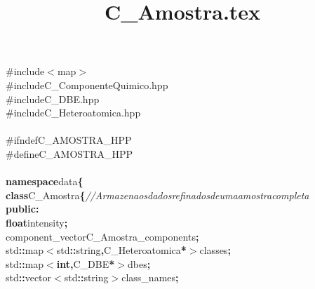 \documentclass[a4paper, 11pt]{article}
\title{C_Amostra.tex}
\newcommand\SPC{\hspace*{0.6em}}
\newcommand\QOT{\mbox{\char 34}}
\newcommand{\CppAComment}[1]{\textit{\textcolor[rgb]{0.2,0.6,1}{#1}}}
\newcommand{\CppAIdentifier}[1]{#1}
\newcommand{\CppAPreprocessor}[1]{\textcolor[rgb]{0,0.5,0}{#1}}
\newcommand{\CppAReservedWord}[1]{\textbf{#1}}
\newcommand{\CppASpace}[1]{\colorbox[rgb]{1,1,1}{#1}}
\newcommand{\CppASymbol}[1]{\textbf{\textcolor[rgb]{1,0,0}{#1}}}
\begin{document}
\begin{ttfamily}
\noindent
\CppAPreprocessor{\#include\SPC $<$map$>$}\\
\CppAPreprocessor{\#include\SPC \QOT C\_ComponenteQuimico.hpp\QOT }\\
\CppAPreprocessor{\#include\SPC \QOT C\_DBE.hpp\QOT }\\
\CppAPreprocessor{\#include\SPC \QOT C\_Heteroatomica.hpp\QOT }\\
\\
\CppAPreprocessor{\#ifndef\SPC C\_AMOSTRA\_HPP}\\
\CppAPreprocessor{\#define\SPC C\_AMOSTRA\_HPP}\\
\\
\CppAReservedWord{namespace}\CppASpace{\SPC }\CppAIdentifier{data}\CppASymbol{\{}\\
\CppASpace{\SPC \SPC \SPC \SPC \SPC \SPC \SPC \SPC }\CppAReservedWord{class}\CppASpace{\SPC }\CppAIdentifier{C\_Amostra}\CppASymbol{\{}\CppASpace{\SPC }\CppAComment{//\SPC Armazena\SPC os\SPC dados\SPC refinados\SPC de\SPC uma\SPC amostra\SPC completa}\\
\CppASpace{\SPC \SPC \SPC \SPC \SPC \SPC \SPC \SPC }\CppAReservedWord{public}\CppASymbol{:}\\
\CppASpace{\SPC \SPC \SPC \SPC \SPC \SPC \SPC \SPC \SPC \SPC \SPC \SPC }\CppAReservedWord{float}\CppASpace{\SPC }\CppAIdentifier{intensity}\CppASymbol{;}\\
\CppASpace{\SPC \SPC \SPC \SPC \SPC \SPC \SPC \SPC \SPC \SPC \SPC \SPC }\CppAIdentifier{component\_vector}\CppASpace{\SPC }\CppAIdentifier{C\_Amostra\_components}\CppASymbol{;}\\
\CppASpace{\SPC \SPC \SPC \SPC \SPC \SPC \SPC \SPC \SPC \SPC \SPC \SPC }\CppAIdentifier{std}\CppASymbol{::}\CppAIdentifier{map}\CppASymbol{$<$}\CppAIdentifier{std}\CppASymbol{::}\CppAIdentifier{string}\CppASymbol{,}\CppASpace{\SPC }\CppAIdentifier{C\_Heteroatomica}\CppASymbol{*}\CppASymbol{$>$}\CppASpace{\SPC }\CppAIdentifier{classes}\CppASymbol{;}\\
\CppASpace{\SPC \SPC \SPC \SPC \SPC \SPC \SPC \SPC \SPC \SPC \SPC \SPC }\CppAIdentifier{std}\CppASymbol{::}\CppAIdentifier{map}\CppASymbol{$<$}\CppAReservedWord{int}\CppASymbol{,}\CppASpace{\SPC }\CppAIdentifier{C\_DBE}\CppASymbol{*}\CppASymbol{$>$}\CppASpace{\SPC }\CppAIdentifier{dbes}\CppASymbol{;}\\
\CppASpace{\SPC \SPC \SPC \SPC \SPC \SPC \SPC \SPC \SPC \SPC \SPC \SPC }\CppAIdentifier{std}\CppASymbol{::}\CppAIdentifier{vector}\CppASymbol{$<$}\CppAIdentifier{std}\CppASymbol{::}\CppAIdentifier{string}\CppASymbol{$>$}\CppASpace{\SPC }\CppAIdentifier{class\_names}\CppASymbol{;}\\

\end{ttfamily}
\end{document}
